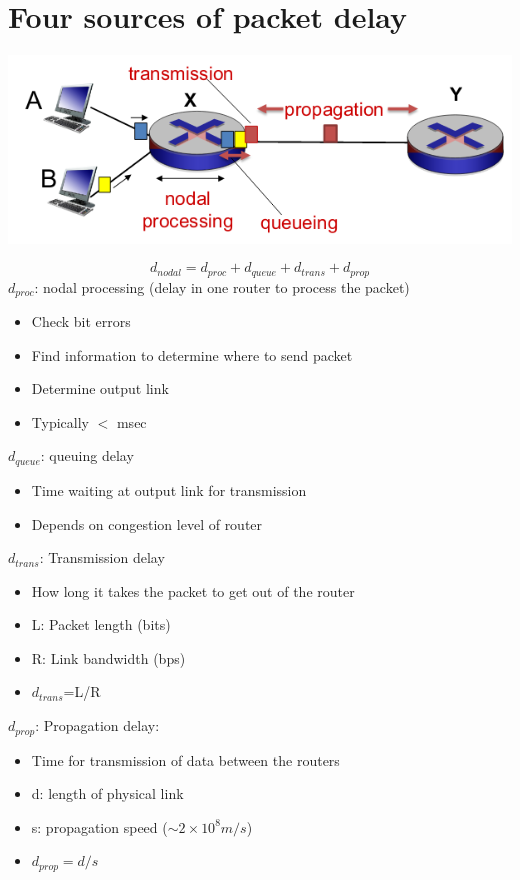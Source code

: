 \documentclass{article}[18pt]
\begin{document}
\section{Four sources of packet delay}
\begin{center}
	\includegraphics[scale=0.7]{loss1}
\end{center}
{\Large
$$d_{nodal}=d_{proc}+d_{queue}+d_{trans}+d_{prop}$$}
$d_{proc}$: nodal processing (delay in one router to process the packet)
\begin{itemize}
	\item Check bit errors
	\item Find information to determine where to send packet
	\item Determine output link
	\item Typically $<$ msec
\end{itemize}
$d_{queue}$: queuing delay
\begin{itemize}
	\item Time waiting at output link for transmission
	\item Depends on congestion level of router
\end{itemize}
$d_{trans}$: Transmission delay
\begin{itemize}
	\item How long it takes the packet to get out of the router
	\item L: Packet length (bits)
	\item R: Link bandwidth (bps)
	\item $d_{trans}$=L/R
\end{itemize}
$d_{prop}$: Propagation delay:
\begin{itemize}
	\item Time for transmission of data between the routers
	\item d: length of physical link
	\item s: propagation speed ($\sim 2\times 10^8 m/s$)
	\item $d_{prop}=d/s$
\end{itemize}
\end{document}
